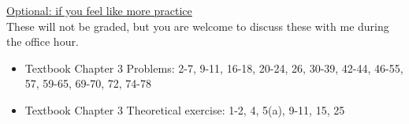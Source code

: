 \documentclass[11pt]{article}
\begin{document}
\vspace{12pt}

\underline{Optional: if you feel like more practice}\\
These will not be graded, but you are welcome to discuss these with me during the office hour.

\begin{itemize}


\item Textbook  Chapter 3 Problems: 2-7, 9-11, 16-18, 20-24, 26, 30-39, 42-44, 46-55, 57, 59-65, 69-70, 72, 74-78
\item Textbook  Chapter 3 Theoretical exercise: 1-2, 4, 5(a), 9-11, 15, 25

\end{itemize}
\end{document}
